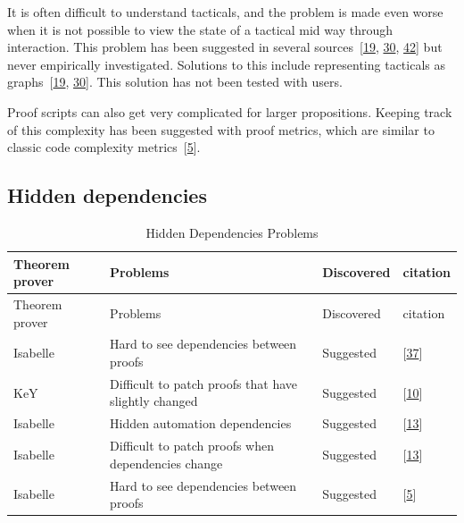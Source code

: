\documentclass[
]{article}
\begin{document}
It is often difficult to understand tacticals, and the problem is made
even worse when it is not possible to view the state of a tactical mid
way through interaction. This problem has been suggested in several
sources~{[}\protect\hyperlink{ref-grov_tinker_2018}{19},
\protect\hyperlink{ref-lin_understanding_2016}{30},
\protect\hyperlink{ref-zacchiroli_user_2007}{42}{]} but never
empirically investigated. Solutions to this include representing
tacticals as graphs~{[}\protect\hyperlink{ref-grov_tinker_2018}{19},
\protect\hyperlink{ref-lin_understanding_2016}{30}{]}. This solution has
not been tested with users.

Proof scripts can also get very complicated for larger propositions.
Keeping track of this complexity has been suggested with proof metrics,
which are similar to classic code complexity
metrics~{[}\protect\hyperlink{ref-aspinall_towards_2016}{5}{]}.

\hypertarget{hidden-dependencies-1}{%
\subsection{Hidden dependencies}\label{hidden-dependencies-1}}

\hypertarget{tbl:hidden_dependencies}{}
\begin{longtable}[]{@{}llll@{}}
\caption{\label{tbl:hidden_dependencies}Hidden Dependencies
Problems}\tabularnewline
\toprule
Theorem prover & Problems & Discovered & citation \\
\midrule
\endfirsthead
\toprule
Theorem prover & Problems & Discovered & citation \\
\midrule
\endhead
Isabelle & Hard to see dependencies between proofs & Suggested &
{[}\protect\hyperlink{ref-spichkova_human-centred_2017}{37}{]} \\
KeY & Difficult to patch proofs that have slightly changed & Suggested &
{[}\protect\hyperlink{ref-beckert_evaluating_2012}{10}{]} \\
Isabelle & Hidden automation dependencies & Suggested &
{[}\protect\hyperlink{ref-bourke_challenges_2012}{13}{]} \\
Isabelle & Difficult to patch proofs when dependencies change &
Suggested & {[}\protect\hyperlink{ref-bourke_challenges_2012}{13}{]} \\
Isabelle & Hard to see dependencies between proofs & Suggested &
{[}\protect\hyperlink{ref-aspinall_towards_2016}{5}{]} \\
\bottomrule
\end{longtable}
\end{document}
